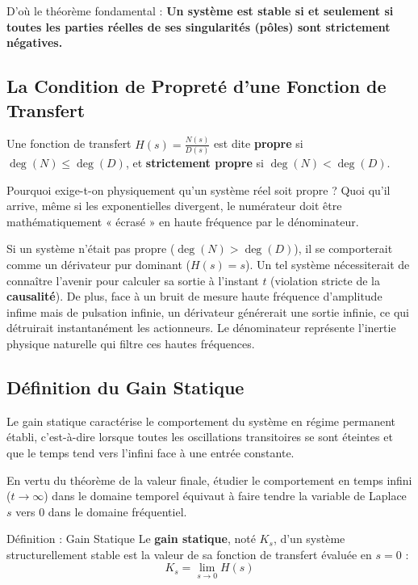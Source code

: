 \documentclass[11pt,a4paper]{report}
\begin{document}
D'où le théorème fondamental : \textbf{Un système est stable si et seulement si toutes les parties réelles de ses singularités (pôles) sont strictement négatives.}

\subsection{La Condition de Propreté d'une Fonction de Transfert}

Une fonction de transfert $H(s) = \frac{N(s)}{D(s)}$ est dite \textbf{propre} si $\deg(N) \le \deg(D)$, et \textbf{strictement propre} si $\deg(N) < \deg(D)$. 

Pourquoi exige-t-on physiquement qu'un système réel soit propre ? Quoi qu'il arrive, même si les exponentielles divergent, le numérateur doit être mathématiquement « écrasé » en haute fréquence par le dénominateur. 

Si un système n'était pas propre ($\deg(N) > \deg(D)$), il se comporterait comme un dérivateur pur dominant ($H(s) = s$). Un tel système nécessiterait de connaître l'avenir pour calculer sa sortie à l'instant $t$ (violation stricte de la \textbf{causalité}). De plus, face à un bruit de mesure haute fréquence d'amplitude infime mais de pulsation infinie, un dérivateur générerait une sortie infinie, ce qui détruirait instantanément les actionneurs. Le dénominateur représente l'inertie physique naturelle qui filtre ces hautes fréquences.

\subsection{Définition du Gain Statique}

Le gain statique caractérise le comportement du système en régime permanent établi, c'est-à-dire lorsque toutes les oscillations transitoires se sont éteintes et que le temps tend vers l'infini face à une entrée constante.

En vertu du théorème de la valeur finale, étudier le comportement en temps infini ($t \to \infty$) dans le domaine temporel équivaut à faire tendre la variable de Laplace $s$ vers $0$ dans le domaine fréquentiel.

\begin{defbox}{Définition : Gain Statique}
    Le \textbf{gain statique}, noté $K_s$, d'un système structurellement stable est la valeur de sa fonction de transfert évaluée en $s=0$ :
    \[ K_s = \lim_{s \to 0} H(s) \]
\end{defbox}
\end{document}
